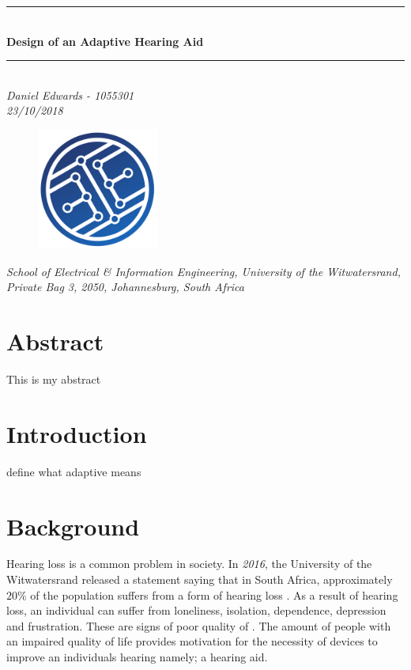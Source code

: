 \documentclass[12pt, onecolumn]{article}
\begin{document}
\begin{titlepage}
\begin{center}   


\vspace{3 cm}


\rule{500pt}{1pt}\\
\vspace{0.5cm}
\textbf{\LARGE Design of an Adaptive Hearing Aid}
\rule{500pt}{1pt}\\
\vspace{1cm}
\textit{Daniel Edwards - 1055301 \\ 23/10/2018}



\begin{figure}[h]
\centering
\includegraphics[width=4cm]{schoolLogo.png}
\end{figure}
\textit{School of Electrical \& Information Engineering, University of the
Witwatersrand, Private Bag 3, 2050, Johannesburg, South Africa}

\end{center}
\section*{Abstract}

This is my abstract
\end{titlepage}

\tableofcontents
\newpage

\section{Introduction}

define what adaptive means

\section{Background}

\noindent Hearing loss is a common problem in society. In \textit{2016}, the University of the Witwatersrand released a statement saying that in South Africa, approximately $20\%$ of the population suffers from a form of hearing loss \cite{witsHearingStats}. As a result of hearing loss, an individual can suffer from loneliness, isolation, dependence, depression and frustration. These are signs of poor quality of \cite{qualityOfLife}. The amount of people with an impaired quality of life provides motivation for the necessity of devices to improve an individuals hearing namely; a hearing aid. 
\end{document}
